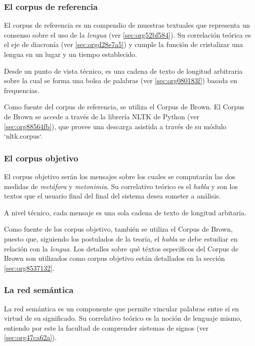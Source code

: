 \documentclass[12pt,letterpaper,twoside]{article}
\begin{document}
\subsubsection{El corpus de referencia}
\label{sec:orgf706c36}

El corpus de referencia es un compendio de muestras textuales que
representa un consenso sobre el uso de la \emph{lengua}
(ver \ref{sec:org52bf584}). Su correlación teórica es el eje de diacronía (ver
\ref{sec:orgd28e7a5}) y cumple la función de cristalizar una
lengua en un lugar y un tiempo establecido.

Desde un punto de vista técnico, es una cadena de texto de
longitud arbitraria sobre la cual se forma una bolsa de palabras
(ver \ref{sec:org080183f}) basada en frequencias.

Como fuente del corpus de referencia, se utiliza el Corpus de
Brown. El Corpus de Brown se accede a través de la librería NLTK
de Python (ver \ref{sec:org88564fb}), que provee una descarga asistida a través
de su módulo `nltk.corpus`.


\subsubsection{El corpus objetivo}
\label{sec:orgea754f2}

El corpus objetivo serán los mensajes sobre los cuales se
computarán las dos medidas de \emph{metáfora} y \emph{metonimia}.  Su
correlativo teórico es el \emph{habla} y son los textos que el usuario
final del final del sistema desea someter a análisis.

A nivel técnico, cada mensaje es una sola cadena de texto de
longitud arbitaria.

Como fuente de los corpus objetivo, también se utiliza el Corpus
de Brown, puesto que, siguiendo los postulados de la teoría, el
\emph{habla} se debe estudiar en relación con la \emph{lengua}. Los
detalles sobre qué téxtos específicos del Corpus de Brown son
utilizados como corpus objetivo están detallados en la sección
\ref{sec:org8537132}.



\subsubsection{La red semántica}
\label{sec:org5d724f7}

La red semántica es un componente que permite vincular palabras
entre sí en virtud de su significado. Su correlativo teórico
es la noción de lenguaje mismo, entiendo por este la facultad
de comprender sistemas de signos (ver \ref{sec:org47ca62a}).
\end{document}
